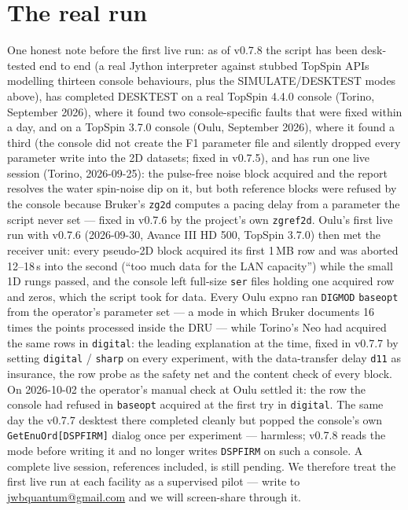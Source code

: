 \documentclass[11pt]{article}
\newcommand{\ts}{TopSpin}
\newcommand{\file}[1]{\texttt{#1}}
\begin{document}
\section{The real run}
\label{sec:dialogs}

One honest note before the first live run: as of v0.7.8 the script has been
desk-tested end to end (a real Jython interpreter against stubbed \ts{}
APIs modelling thirteen console behaviours, plus the SIMULATE/DESKTEST modes
above), has completed DESKTEST on a real \ts{} 4.4.0 console (Torino,
September 2026), where it found two console-specific faults that were fixed
within a day, and on a \ts{} 3.7.0 console (Oulu, September 2026), where it
found a third (the console did not create the F1 parameter file and silently
dropped every parameter write into the 2D datasets; fixed in v0.7.5), and
has run one live session (Torino, 2026-09-25): the pulse-free noise block
acquired and the report resolves the water spin-noise dip on it, but both
reference blocks were refused by the console because Bruker's \file{zg2d}
computes a pacing delay from a parameter the script never set --- fixed in
v0.7.6 by the project's own \file{zgref2d}. Oulu's first live run with
v0.7.6 (2026-09-30, Avance III HD 500, \ts{} 3.7.0) then met the receiver
unit: every pseudo-2D block acquired its first 1\,MB row and was aborted
12--18\,s into the second (``too much data for the LAN capacity'') while
the small 1D rungs passed, and the console left full-size \file{ser} files
holding one acquired row and zeros, which the script took for data. Every
Oulu expno ran \texttt{DIGMOD} \texttt{baseopt} from the operator's
parameter set --- a mode in which Bruker documents 16 times the points
processed inside the DRU --- while Torino's Neo had acquired the same rows
in \texttt{digital}: the leading explanation at the time, fixed in v0.7.7 by setting
\texttt{digital} / \texttt{sharp} on every experiment, with the
data-transfer delay \texttt{d11} as insurance, the row probe as the safety
net and the content check of every block. On 2026-10-02 the operator's
manual check at Oulu settled it: the row the console had refused in
\texttt{baseopt} acquired at the first try in \texttt{digital}. The same
day the v0.7.7 desktest there completed cleanly but popped the console's
own \texttt{GetEnuOrd[DSPFIRM]} dialog once per experiment --- harmless;
v0.7.8 reads the mode before writing it and no longer writes
\texttt{DSPFIRM} on such a console. A
complete live session, references included, is still pending. We therefore treat the first live
run at each facility as a supervised pilot --- write to
\href{mailto:jwbquantum@gmail.com}{jwbquantum@gmail.com} and we will
screen-share through it.
\end{document}
